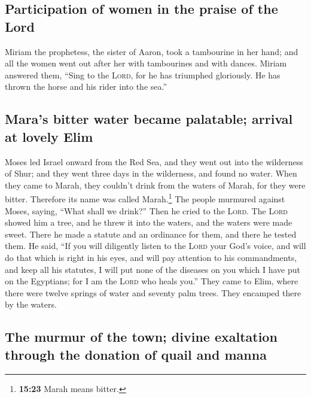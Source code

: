 \hypertarget{participation-of-women-in-the-praise-of-the-lord}{%
\subsection{Participation of women in the praise of the
Lord}\label{participation-of-women-in-the-praise-of-the-lord}}

 Miriam the prophetess, the sister of Aaron, took a
tambourine in her hand; and all the women went out after her with
tambourines and with dances.  Miriam answered them,
``Sing to the \textsc{Lord}, for he has triumphed gloriously. He has
thrown the horse and his rider into the sea.''

\hypertarget{maras-bitter-water-became-palatable-arrival-at-lovely-elim}{%
\subsection{Mara's bitter water became palatable; arrival at lovely
Elim}\label{maras-bitter-water-became-palatable-arrival-at-lovely-elim}}

 Moses led Israel onward from the Red Sea, and they went
out into the wilderness of Shur; and they went three days in the
wilderness, and found no water.  When they came to Marah,
they couldn't drink from the waters of Marah, for they were bitter.
Therefore its name was called Marah.\footnote{\textbf{15:23} Marah means
  bitter.}  The people murmured against Moses, saying,
``What shall we drink?''  Then he cried to the
\textsc{Lord}. The \textsc{Lord} showed him a tree, and he threw it into
the waters, and the waters were made sweet. There he made a statute and
an ordinance for them, and there he tested them.  He
said, ``If you will diligently listen to the \textsc{Lord} your God's
voice, and will do that which is right in his eyes, and will pay
attention to his commandments, and keep all his statutes, I will put
none of the diseases on you which I have put on the Egyptians; for I am
the \textsc{Lord} who heals you.''  They came to Elim,
where there were twelve springs of water and seventy palm trees. They
encamped there by the waters.

\hypertarget{the-murmur-of-the-town-divine-exaltation-through-the-donation-of-quail-and-manna}{%
\subsection{The murmur of the town; divine exaltation through the
donation of quail and
manna}\label{the-murmur-of-the-town-divine-exaltation-through-the-donation-of-quail-and-manna}}

